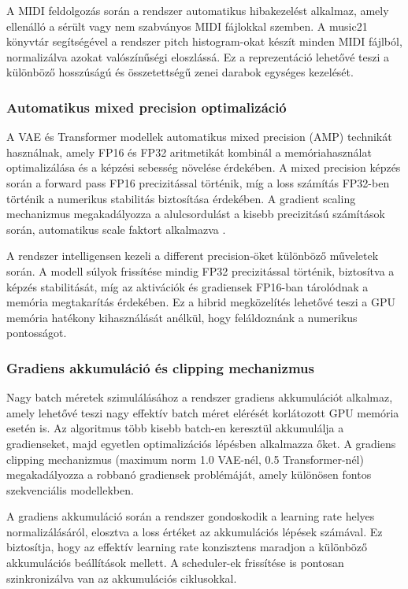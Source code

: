 A MIDI feldolgozás során a rendszer automatikus hibakezelést alkalmaz, amely ellenálló a sérült vagy nem szabványos MIDI fájlokkal szemben. A music21 könyvtár segítségével a rendszer pitch histogram-okat készít minden MIDI fájlból, normalizálva azokat valószínűségi eloszlássá. Ez a reprezentáció lehetővé teszi a különböző hosszúságú és összetettségű zenei darabok egységes kezelését.

\subsubsection{Automatikus mixed precision optimalizáció}
A VAE és Transformer modellek automatikus mixed precision (AMP) technikát használnak, amely FP16 és FP32 aritmetikát kombinál a memóriahasználat optimalizálása és a képzési sebesség növelése érdekében. A mixed precision képzés során a forward pass FP16 precizitással történik, míg a loss számítás FP32-ben történik a numerikus stabilitás biztosítása érdekében. A gradient scaling mechanizmus megakadályozza a alulcsordulást a kisebb precizitású számítások során, automatikus scale faktort alkalmazva \cite{vaswani2017attention}.

A rendszer intelligensen kezeli a different precision-öket különböző műveletek során. A modell súlyok frissítése mindig FP32 precizitással történik, biztosítva a képzés stabilitását, míg az aktivációk és gradiensek FP16-ban tárolódnak a memória megtakarítás érdekében. Ez a hibrid megközelítés lehetővé teszi a GPU memória hatékony kihasználását anélkül, hogy feláldoznánk a numerikus pontosságot.

\subsubsection{Gradiens akkumuláció és clipping mechanizmus}
Nagy batch méretek szimulálásához a rendszer gradiens akkumulációt alkalmaz, amely lehetővé teszi nagy effektív batch méret elérését korlátozott GPU memória esetén is. Az algoritmus több kisebb batch-en keresztül akkumulálja a gradienseket, majd egyetlen optimalizációs lépésben alkalmazza őket. A gradiens clipping mechanizmus (maximum norm 1.0 VAE-nél, 0.5 Transformer-nél) megakadályozza a robbanó gradiensek problémáját, amely különösen fontos szekvenciális modellekben.

A gradiens akkumuláció során a rendszer gondoskodik a learning rate helyes normalizálásáról, elosztva a loss értéket az akkumulációs lépések számával. Ez biztosítja, hogy az effektív learning rate konzisztens maradjon a különböző akkumulációs beállítások mellett. A scheduler-ek frissítése is pontosan szinkronizálva van az akkumulációs ciklusokkal.

